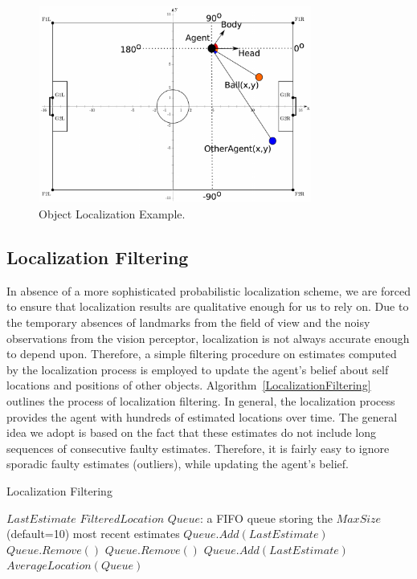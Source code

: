 \begin{figure}[t!]
\centering
  \includegraphics[width=0.8\textwidth]{Chapter3/figures/LocalizationResults.pdf}
  \caption{Object Localization Example.} 
  \label{fig:LocalizationResults}
\end{figure}
\hfill





\subsection{Localization Filtering}
In absence of a more sophisticated probabilistic localization scheme, we are forced to ensure that localization results are qualitative enough for us to rely on. Due to the temporary absences of landmarks from the field of view and the noisy observations from the vision perceptor, localization is not always accurate enough to depend upon. Therefore, a simple filtering procedure on estimates computed by the localization process is employed to update the agent's belief about self locations and positions of other objects. Algorithm~\ref{LocalizationFiltering} outlines the process of localization filtering. In general, the localization process provides the agent with hundreds of estimated locations over time. The general idea we adopt is based on the fact that these estimates do not include long sequences of consecutive faulty estimates. Therefore, it is fairly easy to ignore sporadic faulty estimates (outliers), while updating the agent's belief.

\begin{algorithm}[ht!]
\caption{Localization Filtering}
\label{LocalizationFiltering}
\begin{algorithmic}[1]
$LastEstimate$
$FilteredLocation$
\STATE $Queue$: a FIFO queue storing the $MaxSize$ (default=10) most recent estimates
\STATE 
{}
\STATE $Queue.Add(LastEstimate)$
\STATE $Queue.Remove()$
\ELSE 
{}
\STATE $Queue.Remove()$
\ENDIF
\STATE $Queue.Add(LastEstimate)$
\ENDIF
\RETURN $AverageLocation(Queue)$
\end{algorithmic}
\end{algorithm}

